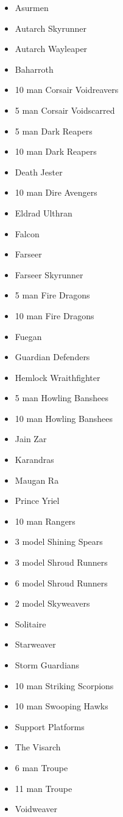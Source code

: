 \documentclass{HordeModeTarot}
\begin{document}
\begin{multicols}{2}
\begin{itemize}[leftmargin=*]
\item[] Asurmen
\item[] Autarch Skyrunner
\item[] Autarch Wayleaper
\item[] Baharroth
\item[] 10 man Corsair Voidreavers
\item[] 5 man Corsair Voidscarred
\item[] 5 man Dark Reapers
\item[] 10 man Dark Reapers
\item[] Death Jester
\item[] 10 man Dire Avengers
\item[] Eldrad Ulthran
\item[] Falcon
\item[] Farseer
\item[] Farseer Skyrunner
\item[] 5 man Fire Dragons
\item[] 10 man Fire Dragons
\item[] Fuegan
\item[] Guardian Defenders
\item[] Hemlock Wraithfighter
\item[] 5 man Howling Banshees
\item[] 10 man Howling Banshees
\item[] Jain Zar
\item[] Karandras
\item[] Maugan Ra
\item[] Prince Yriel
\item[] 10 man Rangers
\item[] 3 model Shining Spears
\item[] 3 model Shroud Runners
\item[] 6 model Shroud Runners
\item[] 2 model Skyweavers
\item[] Solitaire
\item[] Starweaver
\item[] Storm Guardians
\item[] 10 man Striking Scorpions
\item[] 10 man Swooping Hawks
\item[] Support Platforms
\item[] The Visarch
\item[] 6 man Troupe
\item[] 11 man Troupe
\item[] Voidweaver

\end{itemize}
\end{multicols}
\end{document}
